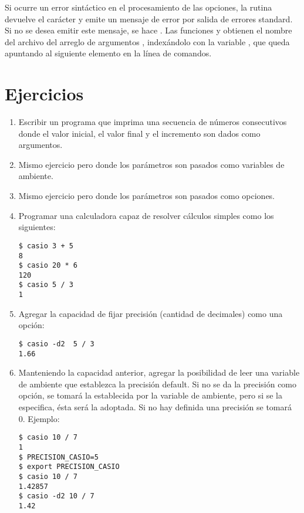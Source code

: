Si ocurre un error sintáctico en el procesamiento de las opciones, la rutina
devuelve el carácter  y emite un mensaje de error por salida de errores
standard. Si no se desea emitir este mensaje, se hace .
Las funciones  y  obtienen el nombre del archivo del
arreglo de argumentos , indexándolo con la variable , que queda
apuntando al siguiente elemento en la línea de comandos.

\section{Ejercicios}
\begin{enumerate}
\item Escribir un programa que imprima una secuencia de números consecutivos donde
el valor inicial, el valor final y el incremento son dados como argumentos.
\item Mismo ejercicio pero donde los parámetros son pasados como variables de
ambiente.
\item Mismo ejercicio pero donde los parámetros son pasados como opciones.
\item Programar una calculadora capaz de resolver cálculos simples como los
siguientes:
\begin{lstlisting}
$ casio 3 + 5
8
$ casio 20 * 6
120
$ casio 5 / 3
1
\end{lstlisting}
\item Agregar la capacidad de fijar precisión (cantidad de decimales) como una
opción:
\begin{lstlisting}
$ casio -d2  5 / 3
1.66
\end{lstlisting}
\item Manteniendo la capacidad anterior, agregar la posibilidad de leer una
variable de ambiente que establezca la precisión default. Si no se da la
precisión como opción, se tomará la establecida por la variable de ambiente,
pero si se la especifica, ésta será la adoptada. Si no hay definida una
precisión se tomará 0. Ejemplo:
\begin{lstlisting}
$ casio 10 / 7
1
$ PRECISION_CASIO=5
$ export PRECISION_CASIO
$ casio 10 / 7
1.42857
$ casio -d2 10 / 7
1.42
\end{lstlisting}
\end{enumerate}


